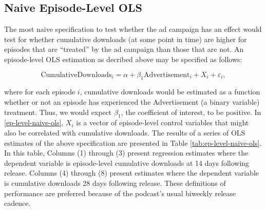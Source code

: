 \documentclass[11pt, letterpaper, twoside]{article}
\begin{document}
\subsection{Naive Episode-Level OLS}
The most naive specification to test whether the ad campaign has an effect would test for whether cumulative downloads (at some point in time) are higher for episodes that are ``treated'' by the ad campaign than those that are not. An episode-level OLS estimation as decribed above may be specified as follows:

\begin{equation}
  \label{ep-level-naive-ols}
  \text{CumulativeDownloads}_i = \alpha + \beta_1\text{Advertisement}_i + X_i +\varepsilon_i, 
\end{equation}

where for each episode $i$, cumulative downloads would be estimated as a function whether or not an episode has experienced the Advertisement (a binary variable) treatment. Thus, we would expect $\beta_1$, the coefficient of interest, to be positive. In \eqref{ep-level-naive-ols}, $X_i$ is a vector of episode-level control variables that might also be correlated with cumulative downloads. The results of a series of OLS estimates of the above specification are presented in Table \ref{tab:ep-level-naive-ols}. In this table, Columns (1) through (3) present regression estimates where the dependent variable is episode-level cumulative downloads at 14 days following release. Columns (4) through (8) present estimates where the dependent variable is cumulative downloads 28 days following release. These definitions of performance are preferred because of the podcast's usual biweekly release cadence.\\

\begin{landscape}
  
\end{landscape}
\end{document}

